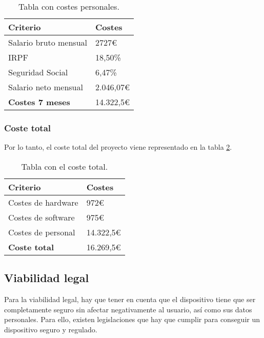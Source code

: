 \begin{table}[H]
\centering
\begin{tabular}{|l|l|}
\hline
\rowcolor[HTML]{BFBFBF} 
\textbf{Criterio} & \textbf{Costes} \\ \hline
Salario bruto mensual & 2727€ \\ \hline
IRPF & 18,50\% \\ \hline
Seguridad Social & 6,47\% \\ \hline
Salario neto mensual & 2.046,07€ \\ \hline
\textbf{Costes 7 meses} & 14.322,5€ \\ \hline
\end{tabular}
\caption{Tabla con costes personales.}
\label{tab:costes_personales}
\end{table}

\subsubsection{Coste total}
Por lo tanto, el coste total del proyecto viene representado en la tabla \ref{tab:coste_total}.

\begin{table}[H]
\centering
\begin{tabular}{|l|l|}
\hline
\rowcolor[HTML]{BFBFBF} 
\textbf{Criterio} & \textbf{Costes} \\ \hline
Costes de hardware & 972€ \\ \hline
Costes de software & 975€ \\ \hline
Costes de personal & 14.322,5€ \\ \hline
\textbf{Coste total} & 16.269,5€ \\ \hline
\end{tabular}
\caption{Tabla con el coste total.}
\label{tab:coste_total}
\end{table}

\subsection{Viabilidad legal}

Para la viabilidad legal, hay que tener en cuenta que el dispositivo tiene que ser completamente seguro sin afectar negativamente al usuario, así como sus datos personales. Para ello, existen legislaciones que hay que cumplir para conseguir un dispositivo seguro y regulado.

